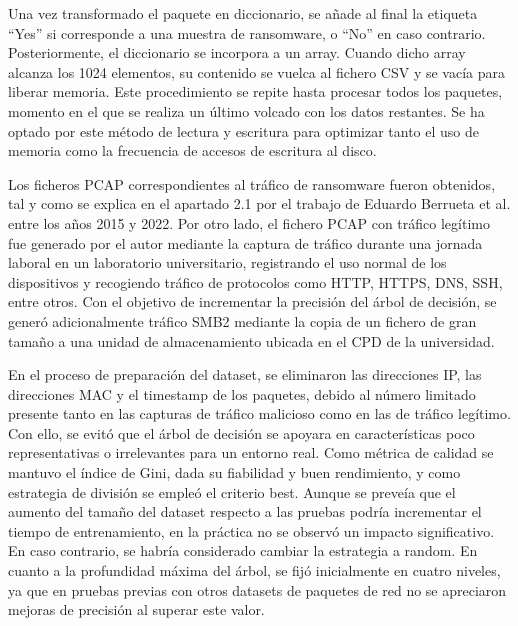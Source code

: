 Una vez transformado el paquete en diccionario, se añade al final la etiqueta ``Yes'' si corresponde a una muestra de ransomware, o ``No'' en caso contrario. Posteriormente, el diccionario se incorpora a un array. Cuando dicho array alcanza los 1024 elementos, su contenido se vuelca al fichero CSV y se vacía para liberar memoria. Este procedimiento se repite hasta procesar todos los paquetes, momento en el que se realiza un último volcado con los datos restantes. Se ha optado por este método de lectura y escritura para optimizar tanto el uso de memoria como la frecuencia de accesos de escritura al disco.

Los ficheros PCAP correspondientes al tráfico de ransomware fueron obtenidos, tal y como se explica en el apartado 2.1 por el trabajo de Eduardo Berrueta et al. entre los años 2015 y 2022\cite{qnyn-q136-20}. Por otro lado, el fichero PCAP con tráfico legítimo fue generado por el autor mediante la captura de tráfico durante una jornada laboral en un laboratorio universitario, registrando el uso normal de los dispositivos y recogiendo tráfico de protocolos como HTTP, HTTPS, DNS, SSH, entre otros. Con el objetivo de incrementar la precisión del árbol de decisión, se generó adicionalmente tráfico SMB2 mediante la copia de un fichero de gran tamaño a una unidad de almacenamiento ubicada en el CPD de la universidad.

En el proceso de preparación del dataset, se eliminaron las direcciones IP, las direcciones MAC y el timestamp de los paquetes, debido al número limitado presente tanto en las capturas de tráfico malicioso como en las de tráfico legítimo. Con ello, se evitó que el árbol de decisión se apoyara en características poco representativas o irrelevantes para un entorno real. Como métrica de calidad se mantuvo el índice de Gini, dada su fiabilidad y buen rendimiento, y como estrategia de división se empleó el criterio best. Aunque se preveía que el aumento del tamaño del dataset respecto a las pruebas podría incrementar el tiempo de entrenamiento, en la práctica no se observó un impacto significativo. En caso contrario, se habría considerado cambiar la estrategia a random. En cuanto a la profundidad máxima del árbol, se fijó inicialmente en cuatro niveles, ya que en pruebas previas con otros datasets de paquetes de red no se apreciaron mejoras de precisión al superar este valor.

